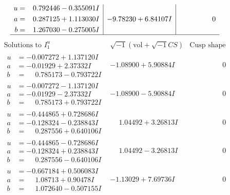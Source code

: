 \documentclass[1p]{elsarticle_modified}
\theoremstyle{definition}
\newcommand{\I}{\sqrt{-1}}
\begin{document}
$$\begin{array}{c|c|c}
\begin{aligned}
u &= \phantom{-}0.792446 - 0.355091 I \\
a &= \phantom{-}0.287125 + 1.113030 I \\
b &= \phantom{-}1.267030 - 0.275005 I\end{aligned}
 & -9.78230 + 6.84107 I & \phantom{-0.000000 } 0\\
 \hline 
 \end{array}$$\newpage$$\begin{array}{c|c|c}  
\text{Solutions to }I^u_{1}& \I (\text{vol} + \sqrt{-1}CS) & \text{Cusp shape}\\
 \hline 
\begin{aligned}
u &= -0.007272 + 1.137120 I \\
a &= -0.01929 + 2.37332 I \\
b &= \phantom{-}0.785173 - 0.793722 I\end{aligned}
 & -1.08900 + 5.90884 I & \phantom{-0.000000 } 0 \\ \hline\begin{aligned}
u &= -0.007272 - 1.137120 I \\
a &= -0.01929 - 2.37332 I \\
b &= \phantom{-}0.785173 + 0.793722 I\end{aligned}
 & -1.08900 - 5.90884 I & \phantom{-0.000000 } 0 \\ \hline\begin{aligned}
u &= -0.444865 + 0.728686 I \\
a &= -0.128324 - 0.238843 I \\
b &= \phantom{-}0.287556 + 0.640106 I\end{aligned}
 & \phantom{-}1.04492 + 3.26813 I & \phantom{-0.000000 } 0 \\ \hline\begin{aligned}
u &= -0.444865 - 0.728686 I \\
a &= -0.128324 + 0.238843 I \\
b &= \phantom{-}0.287556 - 0.640106 I\end{aligned}
 & \phantom{-}1.04492 - 3.26813 I & \phantom{-0.000000 } 0 \\ \hline\begin{aligned}
u &= -0.667184 + 0.506083 I \\
a &= \phantom{-}1.08713 + 0.90478 I \\
b &= \phantom{-}1.072640 - 0.507155 I\end{aligned}
 & -1.13029 + 7.69736 I & \phantom{-0.000000 } 0 \\ \hline\begin{aligned}

\end{aligned}
\end{array}$$
\end{document}
